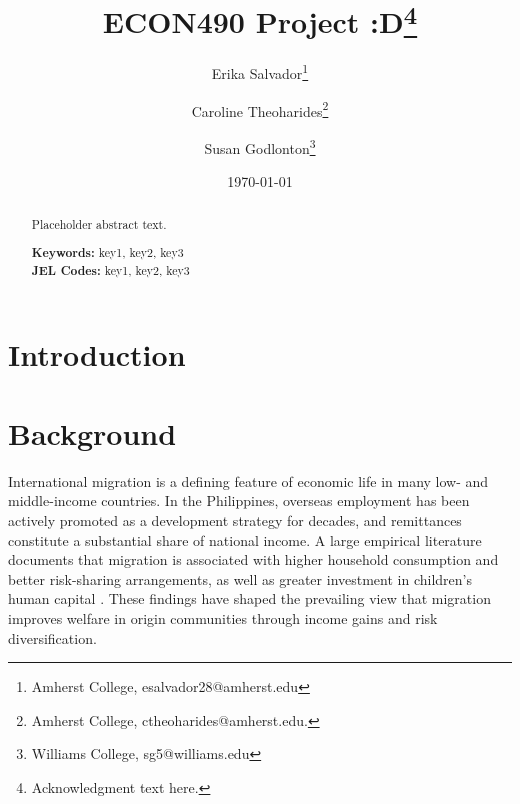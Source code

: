 \documentclass[12pt]{article}
\begin{document}
\title{ECON490 Project :D\thanks{Acknowledgment text here.}}
\author{
Erika Salvador\thanks{Amherst College, esalvador28@amherst.edu} 
\and 
Caroline Theoharides\thanks{Amherst College, ctheoharides@amherst.edu.}
\and
Susan Godlonton\thanks{Williams College, sg5@williams.edu}
}
\date{\today}
\maketitle

\begin{abstract}
Placeholder abstract text.

\medskip
\noindent\textbf{Keywords:} key1, key2, key3 \\
\textbf{JEL Codes:} key1, key2, key3
\end{abstract}

\thispagestyle{empty}
\clearpage
{}


\section{Introduction}
\label{sec:introduction}

\section{Background}
\label{sec:background}

International migration is a defining feature of economic life in many low- and middle-income countries. In the Philippines, overseas employment has been actively promoted as a development strategy for decades, and remittances constitute a substantial share of national income. A large empirical literature documents that migration is associated with higher household consumption and better risk-sharing arrangements, as well as greater investment in children’s human capital \citep{yang2008international, mckenzie2007network}. These findings have shaped the prevailing view that migration improves welfare in origin communities through income gains and risk diversification.
\end{document}
